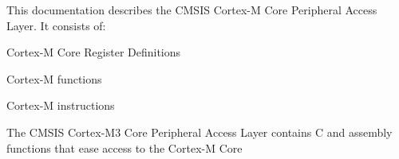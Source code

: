 This documentation describes the CMSIS Cortex-\/M Core Peripheral Access Layer. It consists of\+:


\begin{DoxyItemize}
\item Cortex-\/M Core Register Definitions
\item Cortex-\/M functions
\item Cortex-\/M instructions
\end{DoxyItemize}

The CMSIS Cortex-\/\+M3 Core Peripheral Access Layer contains C and assembly functions that ease access to the Cortex-\/M Core 